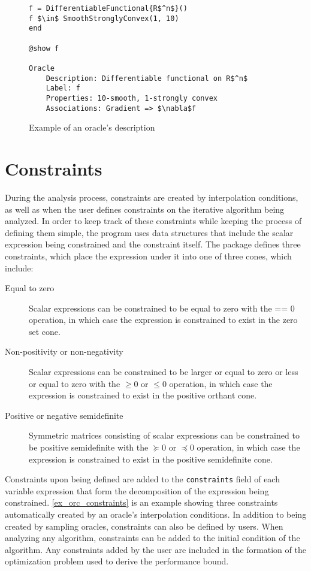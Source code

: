 \begin{itemize}
\begin{figure}[!h]
	\begin{lstlisting}[mathescape]
f = DifferentiableFunctional{R$^n$}()
f $\in$ SmoothStronglyConvex(1, 10)
end

@show f

Oracle
	Description: Differentiable functional on R$^n$
	Label: f
	Properties: 10-smooth, 1-strongly convex
	Associations: Gradient => $\nabla$f
\end{lstlisting}
\caption{Example of an oracle's description}
\label{ex_description}
\end{figure}
\end{itemize}

\section{Constraints} \label{sec_constraints}
During the analysis process, constraints are created by interpolation conditions, as well as when the user defines constraints on the iterative algorithm being analyzed. In order to keep track of these constraints while keeping the process of defining them simple, the program uses data structures that include the scalar expression being constrained and the constraint itself. The package defines three constraints, which place the expression under it into one of three cones, which include:

\begin{description}
	\item[Equal to zero] Scalar expressions can be constrained to be equal to zero with the == 0 operation, in which case the expression is constrained to exist in the zero set cone.
	\item[Non-positivity or non-negativity] Scalar expressions can be constrained to be larger or equal to zero or less or equal to zero with the $\geq 0$ or $\leq 0$ operation, in which case the expression is constrained to exist in the positive orthant cone.
	\item[Positive or negative semidefinite] Symmetric matrices consisting of scalar expressions can be constrained to be positive semidefinite with the $\succeq 0$ or $\preceq 0$ operation, in which case the expression is constrained to exist in the positive semidefinite cone.
\end{description}

Constraints upon being defined are added to the \texttt{constraints} field of each variable expression that form the decomposition of the expression being constrained. \cref{ex_orc_constraints} is an example showing three constraints automatically created by an oracle's interpolation conditions. In addition to being created by sampling oracles, constraints can also be defined by users. When analyzing any algorithm, constraints can be added to the initial condition of the algorithm. Any constraints added by the user are included in the formation of the optimization problem used to derive the performance bound.

